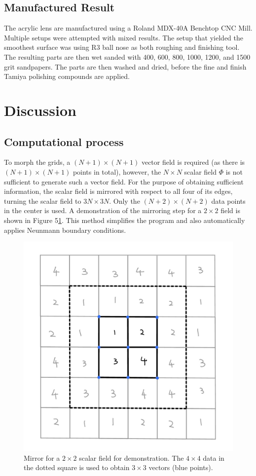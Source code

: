 \documentclass[10pt,two column]{configuration/unoesc}
\begin{document}
\subsection{Manufactured Result}
The acrylic lens are manufactured using a Roland MDX-40A Benchtop CNC Mill. Multiple setups were attempted with mixed results. The setup that yielded the smoothest surface was using R3 ball nose as both roughing and finishing tool. The resulting parts are then wet sanded with 400, 600, 800, 1000, 1200, and 1500 grit sandpapers. The parts are then washed and dried, before the fine and finish Tamiya polishing compounds are applied.\\ %

\section{Discussion}

\subsection{Computational process}

To morph the grids, a $(N+1)\times(N+1)$ vector field is required (as there is $(N+1) \times (N+1)$ points in total), however, the $N \times N$ scalar field $\Phi$ is not sufficient to generate such a vector field.  For the purpose of obtaining sufficient information, the scalar field is mirrored with respect to all four of its edges, turning the scalar field to $3N \times 3N$. Only the $(N+2) \times (N+2)$ data points in the center is used. A demonstration of the mirroring step for a $2 \times 2$ field is shown in Figure 5\ref{fig:6}. This method simplifies the program and also automatically applies Neunmann boundary conditions. \\

\begin{figure}[h!]
\centering
\includegraphics[width=0.7\linewidth]{figures/mirror.jpg} 
\caption{Mirror for a $2 \times 2$ scalar field for demonstration. The $4 \times 4$ data in the dotted square is used to obtain $3 \times 3$ vectors (blue points).}
\label{fig:6}
\end{figure}
\end{document}
